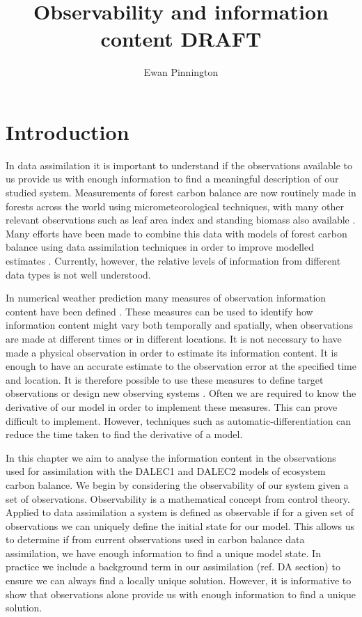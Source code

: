 \documentclass[11pt]{article}
\title{Observability and information content {\color{red}DRAFT}}
\author{Ewan Pinnington}
\begin{document}
\maketitle

\section{Introduction}
In data assimilation it is important to understand if the observations available to us provide us with enough information to find a meaningful description of our studied system. Measurements of forest carbon balance are now routinely made in forests across the world using micrometeorological techniques, with many other relevant observations such as leaf area index and standing biomass also available \citep{baldocchi2008turner}. Many efforts have been made to combine this data with models of forest carbon balance using data assimilation techniques in order to improve modelled estimates \citep{zobitz2011primer, fox2009reflex, richardson2010estimating, Quaife2008, Zobitz2014, Niu2014}. Currently, however, the relative levels of information from different data types is not well understood. 

In numerical weather prediction many measures of observation information content have been defined \citep{Cardinali2004, rodgers2000inverse, fisher2003estimation}. These measures can be used to identify how information content might vary both temporally and spatially, when observations are made at different times or in different locations. It is not necessary to have made a physical observation in order to estimate its information content. It is enough to have an accurate estimate to the observation error at the specified time and location. It is therefore possible to use these measures to define target observations or design new observing systems \citep{palmer1998singular, eyre1990information}. Often we are required to know the derivative of our model in order to implement these measures. This can prove difficult to implement. However, techniques such as automatic-differentiation \citep{renaud1997automatic} can reduce the time taken to find the derivative of a model.  

In this chapter we aim to analyse the information content in the observations used for assimilation with the DALEC1 and DALEC2 models of ecosystem carbon balance. We begin by considering the observability of our system given a set of observations. Observability is a mathematical concept from control theory. Applied to data assimilation a system is defined as observable if for a given set of observations we can uniquely define the initial state for our model. This allows us to determine if from current observations used in carbon balance data assimilation, we have enough information to find a unique model state. In practice we include a background term in our assimilation ({\color{red}ref. DA section}) to ensure we can always find a locally unique solution. However, it is informative to show that observations alone provide us with enough information to find a unique solution.
\end{document}
